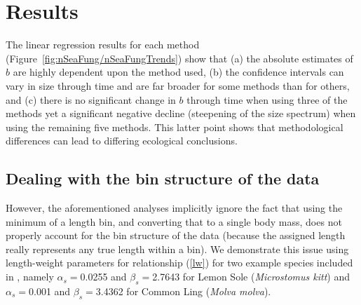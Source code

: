 \documentclass[12pt, letter]{article}
\begin{document}
\section{Results}

The linear regression results for each method (Figure~\ref{fig:nSeaFung/nSeaFungTrends}) show that
(a) the absolute estimates of
$b$ are highly dependent upon the method used, (b) the confidence intervals
can vary in size through time and are far broader for some methods than
for others,
and (c) there is no significant change in $b$ through time when
using three of the methods
yet a significant negative decline (steepening of the size spectrum)
when using the remaining five methods.
This latter point shows that
methodological differences can lead to
differing ecological conclusions.



\subsection{Dealing with the bin structure of the data}

However, the aforementioned analyses implicitly ignore the fact that using the
minimum of a length
bin, and converting that to a single body mass, does not properly account for
the bin structure of the data (because the assigned length really represents any true
length within a bin). We demonstrate this issue using length-weight parameters
for relationship (\ref{lw}) for two example species included in \citet{blan05},
namely $\alpha_s= $0.0255 and $\beta_s=$2.7643 for Lemon Sole ({\it Microstomus
  kitt}) and $\alpha_s=$0.001 and $\beta_s=$3.4362 for Common Ling ({\it Molva
  molva}).
\end{document}
